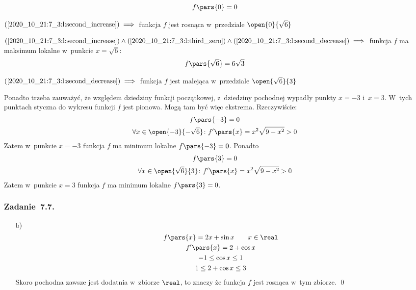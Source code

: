 \begin{itemize}
\begin{description}
                \begin{equation*}
                    f\pars{0} = 0
                \end{equation*}
            \item \(\mbox{(\ref{2020_10_21:7_3:l:second_increase})} \implies\) funkcja \(f\) jest rosnąca w~przedziale \(\open{0}{\sqrt{6}}\)
            \item \(\mbox{(\ref{2020_10_21:7_3:l:second_increase})} \land \mbox{(\ref{2020_10_21:7_3:l:third_zero})} \land \mbox{(\ref{2020_10_21:7_3:l:second_decrease})} \implies\) funkcja \(f\) ma maksimum lokalne w~punkcie \(x = \sqrt{6}\):
                \begin{equation*}
                    f\pars{\sqrt{6}} = 6\sqrt{3}
                \end{equation*}
            \item \(\mbox{(\ref{2020_10_21:7_3:l:second_decrease})} \implies\) funkcja \(f\) jest malejąca w~przedziale \(\open{\sqrt{6}}{3}\)
        \end{description}
        Ponadto trzeba zauważyć, że względem dziedziny funkcji początkowej, z~dziedziny pochodnej wypadły punkty \(x = -3\) i~\(x = 3\). W~tych punktach styczna do wykresu funkcji \(f\) jest pionowa. Mogą tam być więc ekstrema. Rzeczywiście:
        \begin{gather*}
            f\pars{-3} = 0\\
            \forall x \in \open{-3}{-\sqrt{6}}\colon f'\pars{x} = x^2\sqrt{9 - x^2} > 0
        \end{gather*}
        Zatem w~punkcie \(x = -3\) funkcja \(f\) ma minimum lokalne \(f\pars{-3} = 0\). Ponadto
        \begin{gather*}
            f\pars{3} = 0\\
            \forall x \in \open{\sqrt{6}}{3}\colon f'\pars{x} = x^2\sqrt{9 - x^2} > 0
        \end{gather*}
        Zatem w~punkcie \(x = 3\) funkcja \(f\) ma minimum lokalne \(f\pars{3} = 0\).
\end{itemize}
\subsubsection*{Zadanie~7.7.}
\begin{itemize}
    \item[b)]
        \begin{gather*}
            f\pars{x} = 2x + \sin x \qquad x \in \real\\
            f'\pars{x} = 2 + \cos x\\
            -1 \leq \cos x \leq 1\\
            1 \leq 2 + \cos x \leq 3
        \end{gather*}
        Skoro pochodna zawsze jest dodatnia w~zbiorze \(\real\), to znaczy że funkcja \(f\) jest rosnąca w~tym zbiorze.
        \qed
\end{itemize}
